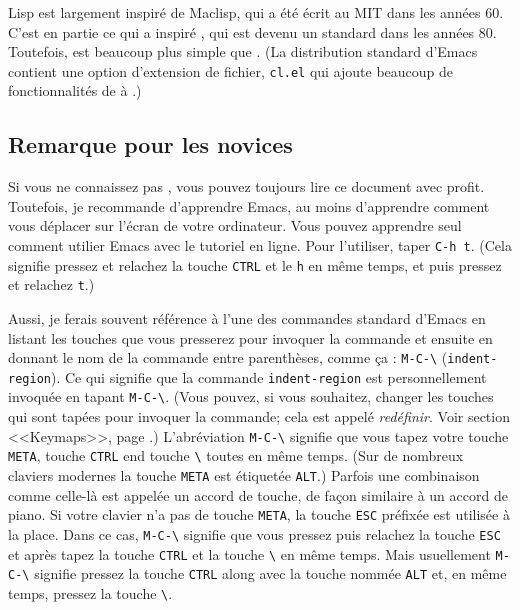 \gnue Lisp est largement inspiré de Maclisp, qui a été écrit au MIT
dans les années 60. C'est en partie ce qui a inspiré \cl, qui
est devenu un standard dans les années 80. Toutefois, \el est beaucoup
plus simple que \cl. (La distribution standard d'Emacs
contient une option d'extension de fichier, \texttt{cl.el} qui ajoute
beaucoup de fonctionnalités de \cl à \el .)

\subsection*{Remarque pour les novices}

Si vous ne connaissez pas \gnue , vous pouvez toujours lire ce
document avec profit. Toutefois, je recommande d'apprendre Emacs, au
moins d'apprendre comment vous déplacer sur l'écran de votre
ordinateur. Vous pouvez apprendre seul comment utilier Emacs avec le
tutoriel en ligne. Pour l'utiliser, taper \texttt{C-h t}. (Cela
signifie pressez et relachez la touche \texttt{CTRL} et le \texttt{h}
en même temps, et puis pressez et relachez \texttt{t}.)

Aussi, je ferais souvent référence à l'une des commandes standard
d'Emacs en listant les touches que vous presserez pour invoquer la
commande et ensuite en donnant le nom de la commande entre
parenthèses, comme ça : \texttt{M-C-\textbackslash} (\texttt{indent-region}). Ce
qui signifie que la commande \texttt{indent-region} est
personnellement invoquée en tapant \texttt{M-C-\textbackslash}. (Vous pouvez, si
vous souhaitez, changer les touches qui sont tapées pour invoquer la
commande; cela est appelé \textit{redéfinir}. Voir section
 <<Keymaps>>, page .) L'abréviation
\texttt{M-C-\textbackslash} signifie que vous tapez votre touche \texttt{META},
touche \texttt{CTRL} end touche \texttt{\textbackslash} toutes en même temps. (Sur
de nombreux claviers modernes la touche \texttt{META} est étiquetée
\texttt{ALT}.) Parfois une combinaison comme celle-là est appelée un
accord de touche, de façon similaire à un accord de piano. Si votre
clavier n'a pas de touche \texttt{META}, la touche \texttt{ESC}
préfixée est utilisée à la place. Dans ce cas, \texttt{M-C-\textbackslash} signifie
que vous pressez puis relachez la touche \texttt{ESC} et après tapez
la touche \texttt{CTRL} et la touche \texttt{\textbackslash} en même temps. Mais
usuellement \texttt{M-C-\textbackslash} signifie pressez la touche \texttt{CTRL}
along avec la touche nommée \texttt{ALT} et, en même temps, pressez la
touche \texttt{\textbackslash}.

